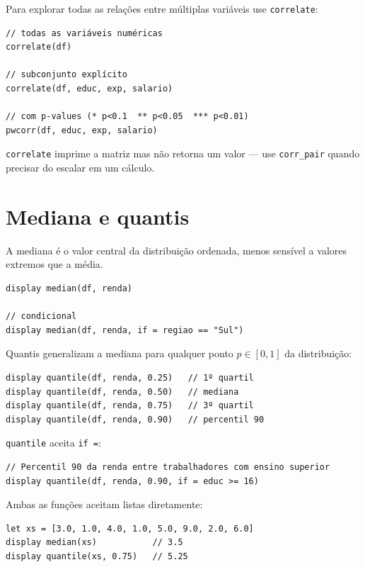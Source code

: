 Para explorar todas as relações entre múltiplas variáveis use
\lstinline{correlate}:

\begin{lstlisting}[caption={Matriz de correlação completa}]
// todas as variáveis numéricas
correlate(df)

// subconjunto explícito
correlate(df, educ, exp, salario)

// com p-values (* p<0.1  ** p<0.05  *** p<0.01)
pwcorr(df, educ, exp, salario)
\end{lstlisting}

\begin{nota}
  \lstinline{correlate} imprime a matriz mas não retorna um valor — use
  \lstinline{corr_pair} quando precisar do escalar em um cálculo.
\end{nota}

\section{Mediana e quantis}

A mediana é o valor central da distribuição ordenada, menos sensível a valores
extremos que a média.

\begin{lstlisting}[caption={Mediana}]
display median(df, renda)

// condicional
display median(df, renda, if = regiao == "Sul")
\end{lstlisting}

Quantis generalizam a mediana para qualquer ponto $p \in [0, 1]$ da
distribuição:

\begin{lstlisting}[caption={Quantis}]
display quantile(df, renda, 0.25)   // 1º quartil
display quantile(df, renda, 0.50)   // mediana
display quantile(df, renda, 0.75)   // 3º quartil
display quantile(df, renda, 0.90)   // percentil 90
\end{lstlisting}

\lstinline{quantile} aceita \lstinline{if =}:

\begin{lstlisting}
// Percentil 90 da renda entre trabalhadores com ensino superior
display quantile(df, renda, 0.90, if = educ >= 16)
\end{lstlisting}

Ambas as funções aceitam listas diretamente:

\begin{lstlisting}
let xs = [3.0, 1.0, 4.0, 1.0, 5.0, 9.0, 2.0, 6.0]
display median(xs)           // 3.5
display quantile(xs, 0.75)   // 5.25
\end{lstlisting}

